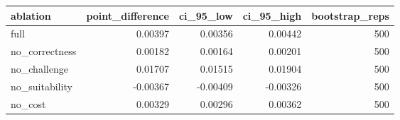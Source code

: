 \begin{tabular}{lrrrr}
\toprule
ablation & point\_difference & ci\_95\_low & ci\_95\_high & bootstrap\_reps \\
\midrule
full & 0.00397 & 0.00356 & 0.00442 & 500 \\
no\_correctness & 0.00182 & 0.00164 & 0.00201 & 500 \\
no\_challenge & 0.01707 & 0.01515 & 0.01904 & 500 \\
no\_suitability & -0.00367 & -0.00409 & -0.00326 & 500 \\
no\_cost & 0.00329 & 0.00296 & 0.00362 & 500 \\
\bottomrule
\end{tabular}
